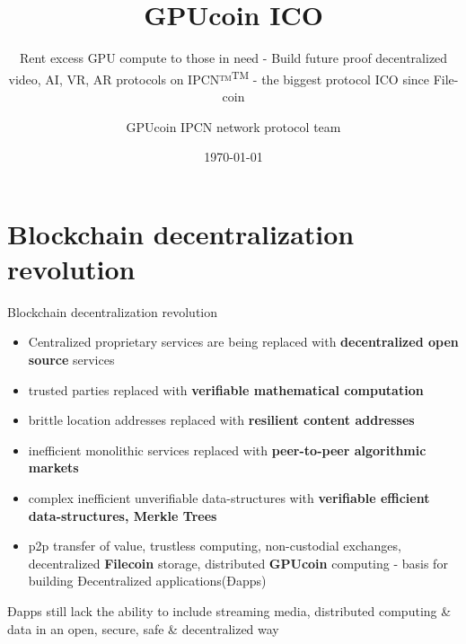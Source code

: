 \documentclass[10pt,handout]{beamer}
\title{ GPUcoin ICO }
\subtitle{Rent excess GPU compute to those in need - Build future proof decentralized video, AI, VR, AR protocols on IPCN™\textsuperscript{TM}
 - the biggest protocol ICO since File-coin}
\date{\today}
\author{GPUcoin IPCN
network protocol team}
\institute{\href{http://gpuco.in}{GPUcoin Foundation}}
\begin{document}
\maketitle


\section{Blockchain decentralization revolution}
\begin{frame}[fragile]{Blockchain decentralization revolution}
 \begin{itemize}[<+-| alert@+>]%
 
\item Centralized proprietary services are being replaced with \textbf{decentralized open source} services
\item trusted parties replaced with \textbf{verifiable mathematical computation}
\item brittle location addresses replaced with \textbf{resilient content addresses}
\item inefficient monolithic services replaced with \textbf{peer-to-peer algorithmic markets}
\item complex inefficient unverifiable data-structures with \textbf{verifiable efficient data-structures, Merkle Trees}
\item p2p transfer of value, trustless computing, non-custodial exchanges, decentralized \textbf{Filecoin} storage, distributed \textbf{GPUcoin} computing - basis for building Ðecentralized applications(Ðapps)

\end{itemize}
 \pause
Ðapps still lack the ability to include streaming media, distributed computing \& data in an open, secure, safe \& decentralized way

\end{frame}
\end{document}
